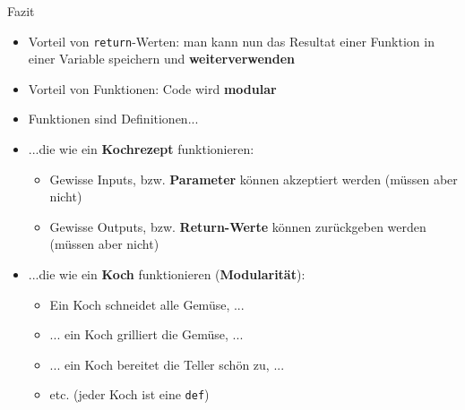 \begin{frame}{Fazit}
	\begin{itemize}[<+->]
		\item {} Vorteil von \lstinline|return|-Werten: man kann nun das Resultat einer Funktion in einer Variable speichern und \textbf{weiterverwenden}
		\item {} Vorteil von Funktionen: Code wird \textbf{modular}
		\item Funktionen sind Definitionen...
		\item {} ...die wie ein \textbf{Kochrezept} funktionieren:
		      \begin{itemize}
			      \item {}   Gewisse Inputs, bzw. \textbf{Parameter} können akzeptiert werden (müssen aber nicht)
			      \item {} Gewisse Outputs, bzw. \textbf{Return-Werte }können zurückgeben werden (müssen aber nicht)
		      \end{itemize}
		\item {} ...die wie ein \textbf{Koch} funktionieren (\textbf{Modularität}):
		      \begin{itemize}
			      \item Ein Koch schneidet alle Gemüse, ...
			      \item ... ein Koch grilliert die Gemüse, ...
			      \item ... ein Koch bereitet die Teller schön zu, ...
			      \item etc. (jeder Koch ist eine \lstinline|def|)
		      \end{itemize}
	\end{itemize}
\end{frame}